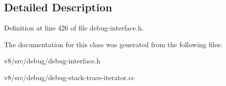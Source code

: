 \subsection{Detailed Description}


Definition at line 426 of file debug-\/interface.\+h.



The documentation for this class was generated from the following files\+:\begin{DoxyCompactItemize}
\item 
v8/src/debug/debug-\/interface.\+h\item 
v8/src/debug/debug-\/stack-\/trace-\/iterator.\+cc\end{DoxyCompactItemize}
